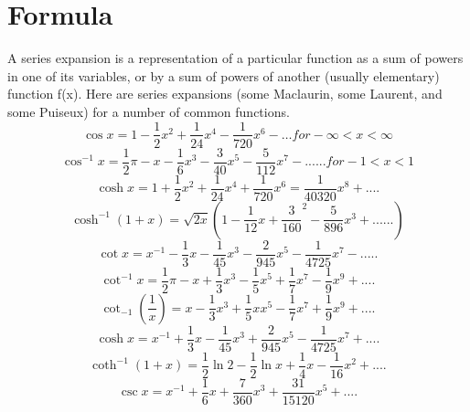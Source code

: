 \section{Formula}
	A series expansion is a representation of a particular function as a sum of powers in one of its variables, or by a sum of powers of another (usually elementary) function  f(x).
	Here are series expansions (some Maclaurin, some Laurent, and some Puiseux) for a number of common functions.
	\newline
\begin{equation}
\cos x = 1- \frac{1}{2}x^{2}+\frac{1}{24}x^{4}-\frac{1}{720}x^{6} - \ldots for -\infty < x < \infty	
\end{equation}
\begin{equation}
\cos^{-1} x = \frac{1}{2} \pi - x - \frac{1}{6} x^{3} - \frac{3}{40} x^{5} - \frac{5}{112} x^{7} - ......for - 1 < x < 1
\end{equation}
\begin{equation}
\cosh x = 1 + \frac{1}{2} x^2  + \frac{1}{24} x^4 + \frac{1}{720} x^6 = \frac{1}{40320} x^8 + ....
\end{equation}
\begin{equation}
\cosh^{-1} (1+x) = \sqrt{2x} (1 - \frac{1}{12} x + \frac{3}{160} ^2 - \frac{5}{896} x^3 + ......) 
\end{equation}
\begin{equation}
\cot x = x^{-1} - \frac{1}{3} x - \frac{1}{45} x^3 - \frac{2}{945} x^5 - \frac{1}{4725} x^7 - .....
\end{equation}
\begin{equation}
\cot^{-1} x = \frac{1}{2} \pi - x + \frac{1}{3} x^3 - \frac{1}{5} x^5 + \frac{1}{7} x^7 - \frac{1}{9} x^9 + ....	
\end{equation}
\begin{equation}
\cot_{-1}(\frac{1}{x}) = x - \frac{1}{3} x^3 + \frac{1}{5} x x^5 - \frac{1}{7} x^7 + \frac{1}{9} x^9 + ....
\end{equation}
\begin{equation}
\cosh x = x^{-1} + \frac{1}{3} x - \frac{1}{45} x^3 + \frac{2}{945} x^5 - \frac{1}{4725} x^7 + ....
\end{equation}
\begin{equation}
\coth^{-1}(1+x) = \frac{1}{2} \ln 2 - \frac{1}{2} \ln x + \frac{1}{4} x - \frac{1}{16} x^2 + ....
\end{equation}
\begin{equation}
\csc x = x^{-1} + \frac{1}{6} x + \frac{7}{360} x^3 + \frac{31}{15120} x^5 + ....
\end{equation}
